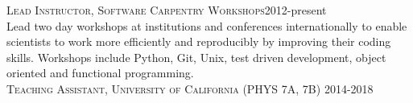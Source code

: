 \documentclass[10pt]{cv}
\begin{document}
\begin{llist}
\vspace{-0.1in}   
\textsc{Lead Instructor, Software Carpentry Workshops}\hfill 2012-present\\
Lead two day workshops at institutions and conferences internationally to enable scientists to work more efficiently and reproducibly by improving their coding skills. Workshops include Python, Git, Unix, test driven development, object oriented and functional programming. 
\\
\textsc{Teaching Assistant, University of California} (PHYS 7A, 7B) \hfill 2014-2018\\

\end{llist}
\end{document}
